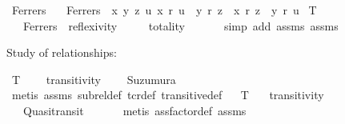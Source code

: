 \begin{isabellebody}
\isamarkupfalse%
\ Ferrers\isanewline
\ \ \ {\isachardoublequoteopen}Ferrers\ {\isasymequiv}\ {\isacharparenleft}{\kern0pt}{\isasymforall}x\ y\ z\ u{\isachardot}{\kern0pt}\ {\isacharparenleft}{\kern0pt}x\ \isactrlbold r\ u\ {\isasymand}\ y\ \isactrlbold r\ z{\isacharparenright}{\kern0pt}\ {\isasymlongrightarrow}\ {\isacharparenleft}{\kern0pt}x\ \isactrlbold r\ z\ {\isasymor}\ y\ \isactrlbold r\ u{\isacharparenright}{\kern0pt}{\isacharparenright}{\kern0pt}{\isachardoublequoteclose}\isanewline
\isanewline
{}\isamarkupfalse%
\ T{}{\isacharcolon}{\kern0pt}\isanewline
\ \ \ Ferrers\ \ reflexivity\ \ %
\isanewline
\ \ \ totality\isanewline
\ \ %
\isanewline
%
\isadelimproof
\ \ %
\endisadelimproof
%
\isatagproof
{}\isamarkupfalse%
\ {\isacharparenleft}{\kern0pt}simp\ add{\isacharcolon}{\kern0pt}\ assms{\isacharparenleft}{\kern0pt}{}{\isacharparenright}{\kern0pt}\ assms{\isacharparenleft}{\kern0pt}{}{\isacharparenright}{\kern0pt}{\isacharparenright}{\kern0pt}%
\endisatagproof
{\isafoldproof}%
%
\isadelimproof
%
\endisadelimproof
%
\begin{isamarkuptext}%
Study of relationships:%
\end{isamarkuptext}\isamarkuptrue%
\isamarkupfalse%
\ T{}{\isacharcolon}{\kern0pt}\ \isanewline
\ \ \ transitivity\ \isanewline
\ \ \ {\isachardoublequoteopen}Suzumura{\isachardoublequoteclose}\isanewline
\ \ %
\isanewline
%
\isadelimproof
\ \ %
\endisadelimproof
%
\isatagproof
{}\isamarkupfalse%
\ {\isacharparenleft}{\kern0pt}metis\ assms\ sub{\isacharunderscore}{\kern0pt}rel{\isacharunderscore}{\kern0pt}def\ tcr{\isacharunderscore}{\kern0pt}def\ transitive{\isacharunderscore}{\kern0pt}def{\isacharparenright}{\kern0pt}%
\endisatagproof
{\isafoldproof}%
%
\isadelimproof
\isanewline
%
\endisadelimproof
\ \isanewline
{}\isamarkupfalse%
\ T{}{\isacharcolon}{\kern0pt}\isanewline
\ \ \ transitivity\ \isanewline
\ \ \ Quasitransit\isanewline
\ \ %
\isanewline
%
\isadelimproof
\ \ %
\endisadelimproof
%
\isatagproof
{}\isamarkupfalse%
\ {\isacharparenleft}{\kern0pt}metis\ assfactor{\isacharunderscore}{\kern0pt}def\ assms{\isacharparenright}{\kern0pt}%
\endisatagproof

\end{isabellebody}

